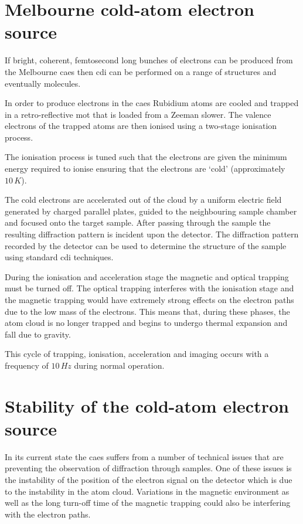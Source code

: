 \section{Melbourne cold-atom electron source}

If bright, coherent, femtosecond long bunches of electrons can be produced from the Melbourne \gls{caes} then \gls{cdi} can be performed on a range of structures and eventually molecules.

In order to produce electrons in the \gls{caes} Rubidium atoms are cooled and trapped in a retro-reflective \gls{mot} that is loaded from a Zeeman slower\cite{phillips_laser_1982, phillips_cooling_1987, bell_slow_2010}. The valence electrons of the trapped atoms are then ionised using a two-stage ionisation process.

The ionisation process is tuned such that the electrons are given the minimum energy required to ionise ensuring that the electrons are `cold' (approximately $10\,\unit{K}$\cite{mcculloch_arbitrarily_2011}).

The cold electrons are accelerated out of the cloud by a uniform electric field generated by charged parallel plates, guided to the neighbouring sample chamber and focused onto the target sample. After passing through the sample the resulting diffraction pattern is incident upon the detector. The diffraction pattern recorded by the detector can be used to determine the structure of the sample using standard \gls{cdi} techniques.

During the ionisation and acceleration stage the magnetic and optical trapping must be turned off. The optical trapping interferes with the ionisation stage and the magnetic trapping would have extremely strong effects on the electron paths due to the low mass of the electrons. This means that, during these phases, the atom cloud is no longer trapped and begins to undergo thermal expansion and fall due to gravity.

This cycle of trapping, ionisation, acceleration and imaging occurs with a frequency of $10\,\unit{Hz}$ during normal operation.

\section{Stability of the cold-atom electron source}

In its current state the \gls{caes} suffers from a number of technical issues that are preventing the observation of diffraction through samples. One of these issues is the instability of the position of the electron signal on the detector which is due to the instability in the atom cloud. Variations in the magnetic environment as well as the long turn-off time of the magnetic trapping could also be interfering with the electron paths.

